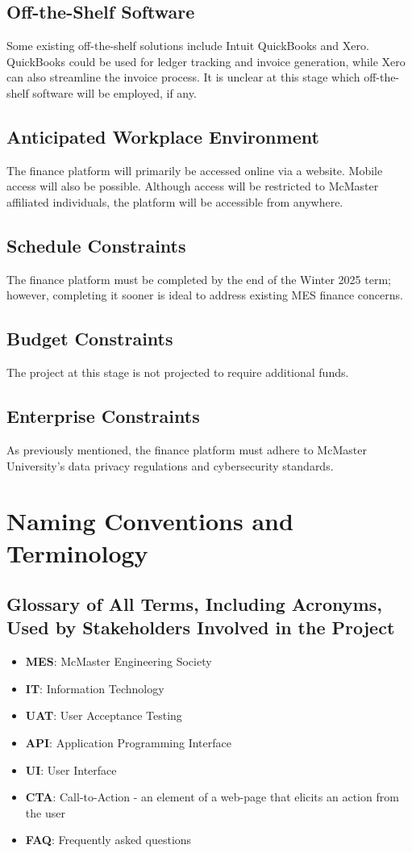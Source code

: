 \documentclass[12pt]{article}
\begin{document}
\subsection{Off-the-Shelf Software}
Some existing off-the-shelf solutions include Intuit QuickBooks and Xero. QuickBooks could be used for ledger tracking and invoice generation, while Xero can also streamline the invoice process. It is unclear at this stage which off-the-shelf software will be employed, if any.

\subsection{Anticipated Workplace Environment}
The finance platform will primarily be accessed online via a website. Mobile access will also be possible. Although access will be restricted to McMaster affiliated individuals, the platform will be accessible from anywhere.

\subsection{Schedule Constraints}
The finance platform must be completed by the end of the Winter 2025 term; however, completing it sooner is ideal to address existing MES finance concerns.

\subsection{Budget Constraints}
The project at this stage is not projected to require additional funds.

\subsection{Enterprise Constraints}
As previously mentioned, the finance platform must adhere to McMaster University’s data privacy regulations and cybersecurity standards.


\section{Naming Conventions and Terminology}
\subsection{Glossary of All Terms, Including Acronyms, Used by Stakeholders Involved in the Project}
\begin{itemize}
    \item \textbf{MES}: McMaster Engineering Society
    \item \textbf{IT}: Information Technology
    \item \textbf{UAT}: User Acceptance Testing
    \item \textbf{API}: Application Programming Interface
    \item \textbf{UI}: User Interface
    \item \textbf{CTA}: Call-to-Action - an element of a web-page that elicits an action from the user
    \item \textbf{FAQ}: Frequently asked questions
\end{itemize}
\end{document}
